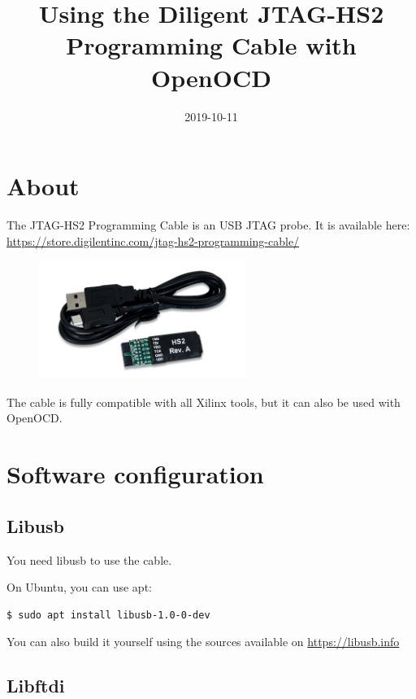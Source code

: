 \documentclass{article}
\title{Using the Diligent JTAG-HS2 Programming Cable with OpenOCD}
\date{2019-10-11}
\begin{document}
	\maketitle
	
	\section{About}
	
	The JTAG-HS2 Programming Cable is an USB JTAG probe. It is available here: \url{https://store.digilentinc.com/jtag-hs2-programming-cable/}
	
	\begin{figure}[H]
   	\centering
   	\includegraphics[width=0.6\textwidth]{hs2.png}
	\end{figure}
	
	The cable is fully compatible with all Xilinx tools, but it can also be used with OpenOCD.
	
	\section{Software configuration}
	
	\subsection{Libusb}
	
	You need libusb to use the cable.
	
	On Ubuntu, you can use apt:
	
	\begin{lstlisting}[language=bash]
    $ sudo apt install libusb-1.0-0-dev
    \end{lstlisting}
    
    You can also build it yourself using the sources available on \url{https://libusb.info}
    
    \subsection{Libftdi}
    
\end{document}
